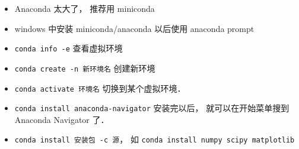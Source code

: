 
\begin{itemize}
\item Anaconda 太大了， 推荐用 miniconda
\item windows 中安装 miniconda/anaconda 以后使用 anaconda prompt
\item \verb|conda info -e| 查看虚拟环境
\item \verb|conda create -n 新环境名| 创建新环境
\item \verb|conda activate 环境名| 切换到某个虚拟环境．
\item \verb|conda install anaconda-navigator| 安装完以后， 就可以在开始菜单搜到 Anaconda Navigator 了．
\item \verb|conda install 安装包 -c 源|， 如 \verb|conda install numpy scipy matplotlib|
\end{itemize}
